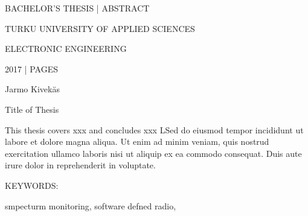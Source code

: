 BACHELOR'S THESIS | ABSTRACT

TURKU UNIVERSITY OF APPLIED SCIENCES

ELECTRONIC ENGINEERING

2017 | \pageref{LastPage} PAGES


\vspace{10mm}
{\Large Jarmo Kivekäs \par}

\vspace{10mm}
{\huge Title of Thesis \par}

\vspace{10mm}

This thesis covers xxx and concludes xxx LSed do eiusmod tempor
incididunt ut labore et dolore magna aliqua. Ut enim ad minim veniam,
quis nostrud exercitation ullamco laboris nisi ut aliquip ex ea commodo
consequat. Duis aute irure dolor in reprehenderit in voluptate.

\vspace{30mm}

KEYWORDS:

smpecturm monitoring, software defned radio,
